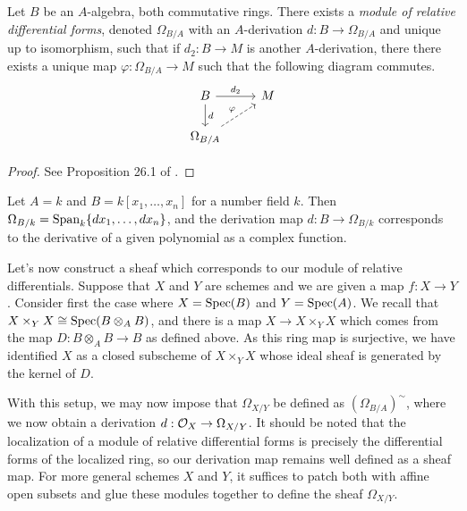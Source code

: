 \begin{proposition}
    Let $B$ be an $A$-algebra,
    both commutative rings.
    There exists a \textit{module of relative differential forms}, 
    denoted $\Omega_{B/A}$ with an $A$-derivation $d : B \to \Omega_{B/A}$ and unique up to isomorphism,
    such that if $d_2 : B \to M$ is another $A$-derivation,
    there there exists a unique map $\varphi : \Omega_{B/A} \to M$ such that the following diagram commutes.
    \[
        \begin{tikzcd}
            B \arrow[d, "d"] \arrow[r, "d_2"] & M \\
            \Omega_{B/A} \arrow[ur, dashed, "\varphi"]
        \end{tikzcd}
    \]
\end{proposition}

\begin{proof}
    See Proposition 26.1 of \cite{Matsumura_1970}.
\end{proof}

\begin{example}
    Let $A = k$ and $B = k[x_1, \ldots, x_n]$ for a number field $k$.
    Then $\Omega_{B/k} = {\rm Span}_k \{dx_1, \ldots, dx_n\}$,
    and the derivation map $d : B \to \Omega_{B/k}$ corresponds to the derivative of a given polynomial as a complex function.
\end{example}

Let's now construct a sheaf which corresponds to our module of relative differentials.
Suppose that $X$ and $Y$ are schemes and we are given a map $f : X \to Y$.
Consider first the case where $X = {\rm Spec}(B)$ and $Y = {\rm Spec}(A)$.
We recall that $X \times_Y X \cong {\rm Spec}(B \otimes_A B)$,
and there is a map $X \to X \times_Y X$ which comes from the map $D : B \otimes_A B \to B$ as defined above.
As this ring map is surjective,
we have identified $X$ as a closed subscheme of $X \times_Y X$ whose ideal sheaf is generated by the kernel of $D$.

With this setup,
we may now impose that $\Omega_{X/Y}$ be defined as $(\Omega_{B/A})^\sim$,
where we now obtain a derivation $d : \mathcal{O}_X \to \Omega_{X/Y}$.
It should be noted that the localization of a module of relative differential forms is precisely the differential forms of the localized ring,
so our derivation map remains well defined as a sheaf map.
For more general schemes $X$ and $Y$,
it suffices to patch both with affine open subsets and glue these modules together to define the sheaf $\Omega_{X/Y}$.

